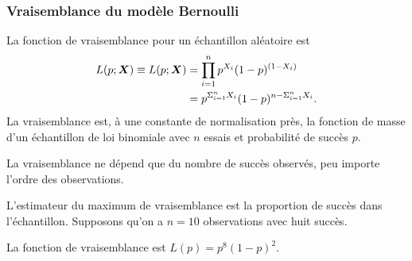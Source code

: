 \documentclass{beamer}
\begin{document}
\begin{frame}[fragile]
\frametitle{Vraisemblance du modèle Bernoulli}
 La fonction de vraisemblance pour un échantillon aléatoire est
\begin{align*}
L(p; \boldsymbol {X}) \equiv L(p; \boldsymbol {X})&=\prod_{i=1}^n p^{X_i} (1-p)^{(1-X_i)}\\&= p^{\Sigma_{i=1}^n X_i}(1-p)^{n-\Sigma_{i=1}^n X_i}.
\end{align*}
% 
La vraisemblance est, à une constante de normalisation près, la fonction de masse d'un échantillon de loi binomiale avec $n$ essais et probabilité de succès $p$.
\bi
\item La vraisemblance ne dépend que du nombre de succès observés, peu importe l'ordre des observations. 
\item  L'estimateur du maximum de vraisemblance est la proportion de succès dans l'échantillon.
\ei
Supposons qu'on a $n=10$ observations avec huit succès.
\bi
\item La fonction de vraisemblance est $L(p)=p^8(1-p)^2$.%
\ei
\end{frame}
\end{document}
